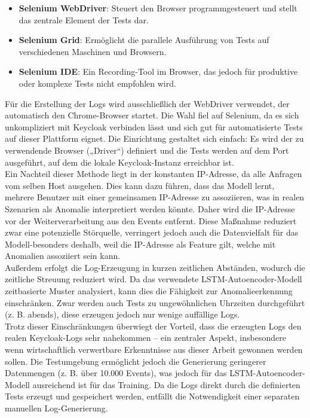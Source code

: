 \documentclass[a4paper,12pt]{article}
\begin{document}
	\begin{itemize}
		\item \textbf{Selenium WebDriver}: Steuert den Browser programmgesteuert und stellt das zentrale Element der Tests dar.
		\item \textbf{Selenium Grid}: Ermöglicht die parallele Ausführung von Tests auf verschiedenen Maschinen und Browsern.
		\item \textbf{Selenium IDE}: Ein Recording-Tool im Browser, das jedoch für produktive oder komplexe Tests nicht empfohlen wird.
	\end{itemize}
	Für die Erstellung der Logs wird ausschließlich der WebDriver verwendet, der automatisch den Chrome-Browser startet. Die Wahl fiel auf Selenium, da es sich unkompliziert mit Keycloak verbinden lässt und sich gut für automatisierte Tests auf dieser Plattform eignet. Die Einrichtung gestaltet sich einfach: Es wird der zu verwendende Browser („Driver“) definiert und die Tests werden auf dem Port ausgeführt, auf dem die lokale Keycloak-Instanz erreichbar ist.
	\\[0.5em]
	Ein Nachteil dieser Methode liegt in der konstanten IP-Adresse, da alle Anfragen vom selben Host ausgehen. Dies kann dazu führen, dass das Modell lernt, mehrere Benutzer mit einer gemeinsamen IP-Adresse zu assoziieren, was in realen Szenarien als Anomalie interpretiert werden könnte. Daher wird die IP-Adresse vor der Weiterverarbeitung aus den Events entfernt. Diese Maßnahme reduziert zwar eine potenzielle Störquelle, verringert jedoch auch die Datenvielfalt für das Modell-besonders deshalb, weil die IP-Adresse als Feature gilt, welche mit Anomalien assoziiert sein kann.
	\\[0.5em]
	Außerdem erfolgt die Log-Erzeugung in kurzen zeitlichen Abständen, wodurch die zeitliche Streuung reduziert wird. Da das verwendete LSTM-Autoencoder-Modell zeitbasierte Muster analysiert, kann dies die Fähigkeit zur Anomalieerkennung einschränken. Zwar werden auch Tests zu ungewöhnlichen Uhrzeiten durchgeführt (z. B. abends), diese erzeugen jedoch nur wenige auffällige Logs.
	\\[0.5em]
	Trotz dieser Einschränkungen überwiegt der Vorteil, dass die erzeugten Logs den realen Keycloak-Logs sehr nahekommen – ein zentraler Aspekt, insbesondere wenn wirtschaftlich verwertbare Erkenntnisse aus dieser Arbeit gewonnen werden sollen. Die Testumgebung ermöglicht jedoch die Generierung geringerer Datenmengen (z. B. über 10.000 Events), was jedoch für das LSTM-Autoencoder-Modell ausreichend ist für das Training. Da die Logs direkt durch die definierten Tests erzeugt und gespeichert werden, entfällt die Notwendigkeit einer separaten manuellen Log-Generierung.
	
\end{document}
